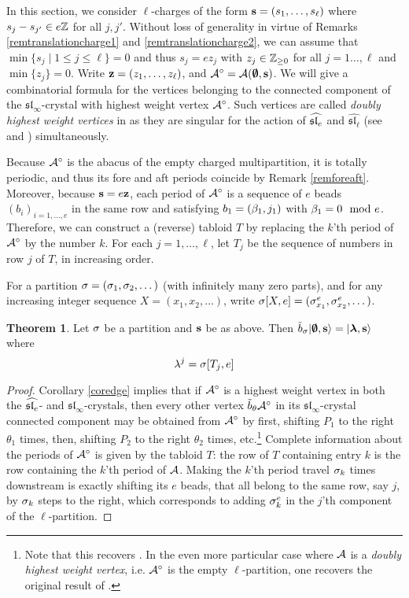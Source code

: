 \documentclass[12pt]{amsart}
\numberwithin{equation}{section}
\theoremstyle{definition}
\newtheorem{theorem}[equation]{Theorem}
\newtheorem{remark}[equation]{Remark}
\newcommand{\bemp}{\bemptyset}
\newcommand{\slell}{\widehat{\mathfrak{sl}_\ell}}
\newcommand{\slinf}{\mathfrak{sl}_\infty}
\begin{document}
In this section, we consider $\ell$-charges of the form $\mathbf{s}=(s_1,\dots,s_\ell)$ 
where $s_j-s_{j'}\in e\mathbb{Z}$ for all $j,j'$.
Without loss of generality in virtue of Remarks \ref{remtranslationcharge1} and \ref{remtranslationcharge2},
we can assume that 
$\min\{ s_j \mid 1\leq j \leq \ell \}=0$ and thus $s_j=ez_j$ with $z_j\in\mathbb{Z}_{\geq0}$ for all $j=1\dots,\ell$ and $\min\{z_j\}=0$.
Write $\mathbf{z}=(z_1,\dots,z_\ell)$, and $\cA^\circ=\cA(\bemp,\bs)$.
We will give a combinatorial formula for the vertices belonging to the connected component of the $\slinf$-crystal with highest weight vertex $\mathcal{A}^\circ$. 
Such vertices are called \textit{doubly highest weight vertices} in \cite{Gerber2016} as they are singular for the action of $\widehat{\mathfrak{sl}_e}$
and $\slell$ (see \cite{Uglov1999} and \cite{Gerber2016}) simultaneously. 



Because $\mathcal{A}^\circ$ is the abacus of the empty charged multipartition, it is totally periodic, and thus its fore and aft periods coincide by Remark \ref{remforeaft}.
Moreover, because $\mathbf{s}=e\mathbf{z}$, each period of $\mathcal{A}^\circ$ is a sequence of $e$ beads $(b_i)_{i=1,\dots,e}$ in the same row and satisfying $b_1=(\beta_1,j_1)$ with $\beta_1=0\mod e$.
Therefore, we can construct a (reverse) tabloid $T$ by replacing the $k$'th period of $\mathcal{A}^\circ$ by the number $k$.
For each $j=1,\dots,\ell$, let $T_j$ be the sequence of numbers in row $j$ of $T$, in increasing order.


For a partition $\sigma=(\sigma_1,\sigma_2,\dots)$ (with infinitely many zero parts), and for 
any increasing integer sequence $X=(x_1,x_2,\dots)$,
write $\sigma[X,e]=(\sigma^e_{x_1},\sigma^e_{x_2},\dots)$.

\begin{theorem}\label{thmwidthe}
Let $\sigma$ be a partition and $\mathbf{s}$ be as above.
Then $\tb_\si|\bemp,\bs\rangle = |\bla,\bs\rangle$ where
$$
\lambda^j = \sigma[T_j,e]
$$
\end{theorem}


\begin{proof}

Corollary \ref{coredge} implies that 
if $\mathcal{A}^\circ$ is a highest weight vertex in both the $\widehat{\mathfrak{sl}_e}$- and $\slinf$-crystals, then every other vertex $\tilde{b}_\theta\mathcal{A}^\circ$ in its $\slinf$-crystal connected component may be obtained from $\mathcal{A}^\circ$ by first, shifting $P_1$ to the right $\theta_1$ times, then, shifting $P_2$ to the right $\theta_2$ times, etc.\footnote{Note that this recovers \cite[Proposition 7.4]{Gerber2016}. In the even more particular case where $\mathcal{A}$ is a \textit{doubly highest weight vertex}, i.e. $\mathcal{A}^\circ$ is the empty $\ell$-partition,
one recovers the original result of \cite[Remark 6.16]{Gerber2016}.} Complete information about the periods of $\mathcal{A}^\circ$ is given by the tabloid $T$:  
the row of $T$ containing entry $k$ is the row containing the $k$'th period of $\mathcal{A}$. Making the $k$'th period travel $\sigma_k$ times downstream is exactly shifting
its $e$ beads, that all belong to the same row, say $j$, by $\sigma_k$ steps to the right, which corresponds
to adding $\sigma_k^e$ in the $j$'th component of the $\ell$-partition.
\end{proof}
\end{document}
